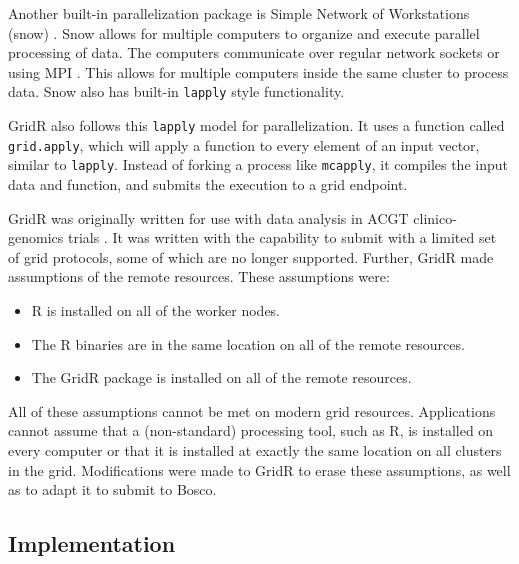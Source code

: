 Another built-in parallelization package is Simple Network of Workstations (snow) \cite{rlangsnow}.  Snow allows for multiple computers to organize and execute parallel processing of data.  The computers communicate over regular network sockets or using MPI \cite{gropp1999using}.  This allows for multiple computers inside the same cluster to process data.  Snow also has built-in \texttt{lapply} style functionality.

GridR also follows this \texttt{lapply} model for parallelization.  It uses a function called \texttt{grid.apply}, which will apply a function to every element of an input vector, similar to \texttt{lapply}.  Instead of forking a process like \texttt{mcapply}, it compiles the input data and function, and submits the execution to a grid endpoint.

GridR was originally written for use with data analysis in ACGT clinico-genomics trials \cite{wegener2007gridr}.  It was written with the capability to submit with a limited set of grid protocols, some of which are no longer supported.  Further, GridR made assumptions of the remote resources.  These assumptions were:

\begin{itemize}
\item R is installed on all of the worker nodes.
\item The R binaries are in the same location on all of the remote resources.
\item The GridR package is installed on all of the remote resources.
\end{itemize}

All of these assumptions cannot be met on modern grid resources.  Applications cannot assume that a (non-standard) processing tool, such as R, is installed on every computer or   that it is installed at exactly the same location on all clusters in the grid.  Modifications were made to GridR to erase these assumptions, as well as to adapt it to submit to Bosco.

\subsection{Implementation}
\label{sec:implementation}


